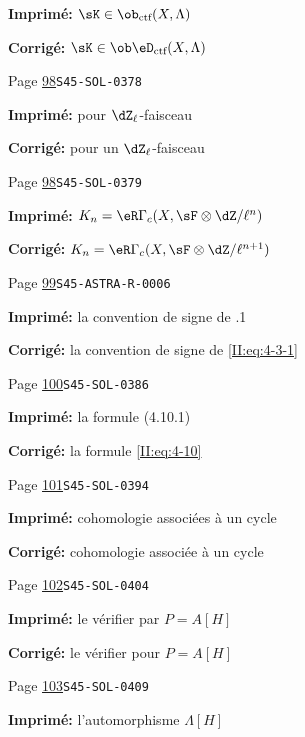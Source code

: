 \begin{description}
\par\noindent\textbf{Imprimé:} \(\sK\in\ob_{\text{ctf}}(X,\Lambda)\)
\par\noindent\textbf{Corrigé:} \(\sK\in\ob\eD_\text{ctf}(X,\Lambda)\)
\smallskip
\item[\hypertarget{apparatus:FR-0053}{53}] Page \hyperlink{printpage:fr:98}{98}\quad\texttt{S45-SOL-0378}
\par\noindent\textbf{Imprimé:} pour 
$\dZ_\ell$-faisceau
\par\noindent\textbf{Corrigé:} pour un 
$\dZ_\ell$-faisceau
\smallskip
\item[\hypertarget{apparatus:FR-0054}{54}] Page \hyperlink{printpage:fr:98}{98}\quad\texttt{S45-SOL-0379}
\par\noindent\textbf{Imprimé:} $K_n=\eR\Gamma_c(X,\sF\otimes\dZ/\ell^n)$
\par\noindent\textbf{Corrigé:} $K_n=\eR\Gamma_c(X,\sF\otimes\dZ/\ell^{n+1})$
\smallskip
\item[\hypertarget{apparatus:FR-0055}{55}] Page \hyperlink{printpage:fr:99}{99}\quad\texttt{S45-ASTRA-R-0006}
\par\noindent\textbf{Imprimé:} la convention de signe de .1
\par\noindent\textbf{Corrigé:} la convention de signe de \ref{II:eq:4-3-1}
\smallskip
\item[\hypertarget{apparatus:FR-0056}{56}] Page \hyperlink{printpage:fr:100}{100}\quad\texttt{S45-SOL-0386}
\par\noindent\textbf{Imprimé:} la formule (4.10.1)
\par\noindent\textbf{Corrigé:} la formule \eqref{II:eq:4-10}
\smallskip
\item[\hypertarget{apparatus:FR-0057}{57}] Page \hyperlink{printpage:fr:101}{101}\quad\texttt{S45-SOL-0394}
\par\noindent\textbf{Imprimé:} cohomologie associées à un cycle
\par\noindent\textbf{Corrigé:} cohomologie associée à un cycle
\smallskip
\item[\hypertarget{apparatus:FR-0058}{58}] Page \hyperlink{printpage:fr:102}{102}\quad\texttt{S45-SOL-0404}
\par\noindent\textbf{Imprimé:} le vérifier par $P=A[H]$
\par\noindent\textbf{Corrigé:} le vérifier pour $P=A[H]$
\smallskip
\item[\hypertarget{apparatus:FR-0059}{59}] Page \hyperlink{printpage:fr:103}{103}\quad\texttt{S45-SOL-0409}
\par\noindent\textbf{Imprimé:} l'automorphisme $\Lambda[H]$

\end{description}
